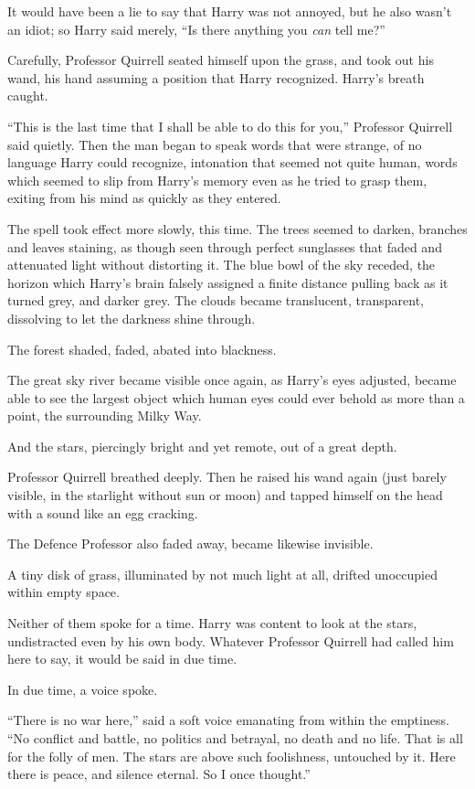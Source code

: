 It would have been a lie to say that Harry was not annoyed, but he also wasn’t an idiot; so Harry said merely, “Is there anything you \emph{can} tell me?”

Carefully, Professor Quirrell seated himself upon the grass, and took out his wand, his hand assuming a position that Harry recognized. Harry’s breath caught.

“This is the last time that I shall be able to do this for you,” Professor Quirrell said quietly. Then the man began to speak words that were strange, of no language Harry could recognize, intonation that seemed not quite human, words which seemed to slip from Harry’s memory even as he tried to grasp them, exiting from his mind as quickly as they entered.

The spell took effect more slowly, this time. The trees seemed to darken, branches and leaves staining, as though seen through perfect sunglasses that faded and attenuated light without distorting it. The blue bowl of the sky receded, the horizon which Harry’s brain falsely assigned a finite distance pulling back as it turned grey, and darker grey. The clouds became translucent, transparent, dissolving to let the darkness shine through.

The forest shaded, faded, abated into blackness.

The great sky river became visible once again, as Harry’s eyes adjusted, became able to see the largest object which human eyes could ever behold as more than a point, the surrounding Milky Way.

And the stars, piercingly bright and yet remote, out of a great depth.

Professor Quirrell breathed deeply. Then he raised his wand again (just barely visible, in the starlight without sun or moon) and tapped himself on the head with a sound like an egg cracking.

The Defence Professor also faded away, became likewise invisible.

A tiny disk of grass, illuminated by not much light at all, drifted unoccupied within empty space.

Neither of them spoke for a time. Harry was content to look at the stars, undistracted even by his own body. Whatever Professor Quirrell had called him here to say, it would be said in due time.

In due time, a voice spoke.

“There is no war here,” said a soft voice emanating from within the emptiness. “No conflict and battle, no politics and betrayal, no death and no life. That is all for the folly of men. The stars are above such foolishness, untouched by it. Here there is peace, and silence eternal. So I once thought.”

